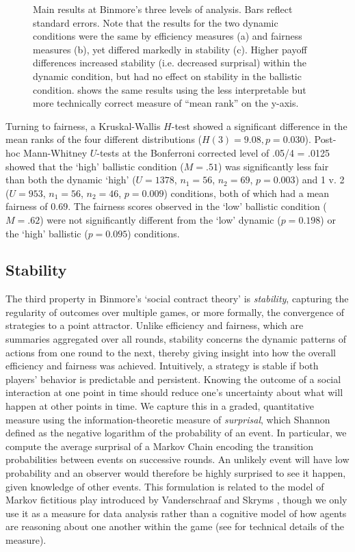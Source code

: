 \documentclass[10pt,letterpaper]{article}
\begin{document}
\begin{figure}[t]
\centering
\caption{Main results at Binmore's three levels of analysis. Bars reflect standard errors. Note that the results for the two dynamic conditions were the same by efficiency measures (a) and fairness measures (b), yet differed markedly in stability (c). Higher payoff differences increased stability (i.e. decreased surprisal) within the dynamic condition, but had no effect on stability in the ballistic condition.  shows the same results using the less interpretable but more technically correct measure of ``mean rank'' on the y-axis.}
\label{Fig2}
\end{figure}

Turning to fairness, a Kruskal-Wallis $H$-test showed a significant difference in the mean ranks of the four different distributions ($H(3) = 9.08, p = 0.030$). Post-hoc Mann-Whitney $U$-tests at the Bonferroni corrected level of .05/4 = .0125 showed that the `high' ballistic condition ($M = .51$)  was significantly less fair than both the dynamic `high' ($U = 1378$, $n_1 = 56$, $n_2 = 69$, $p = 0.003$) and 1 v. 2 ($U =953$, $n_1 = 56$, $n_2 = 46$, $p = 0.009$) conditions, both of which had a mean fairness of $0.69$. The fairness scores observed in the `low' ballistic condition ($M = .62$) were not significantly different from the `low' dynamic ($p = 0.198$) or the `high' ballistic ($p = 0.095$) conditions. 



\subsection*{Stability}

The third property in Binmore's `social contract theory' is \emph{stability}, capturing the regularity of outcomes over multiple games, or more formally, the convergence of strategies to a point attractor. Unlike efficiency and fairness, which are summaries aggregated over all rounds, stability concerns the dynamic patterns of actions from one round to the next, thereby giving insight into how the overall efficiency and fairness was achieved. Intuitively, a strategy is stable if both players' behavior is predictable and persistent. Knowing the outcome of a social interaction at one point in time should reduce one's uncertainty about what will happen at other points in time. We capture this in a graded, quantitative measure using the information-theoretic measure of \emph{surprisal}, which Shannon \cite{Shannon48} defined as the negative logarithm of the probability of an event. In particular, we compute the average surprisal of a Markov Chain encoding the transition probabilities between events on successive rounds. An unlikely event will have low probability and an observer would therefore be highly surprised to see it happen, given knowledge of other events.  This formulation is related to the model of Markov fictitious play introduced by Vanderschraaf and Skryms \cite{VanderschraafSkyrms03_LearningToTakeTurns}, though we only use it as a measure for data analysis rather than a cognitive model of how agents are reasoning about one another within the game (see  for technical details of the measure). 
\end{document}
